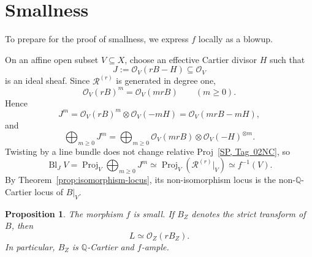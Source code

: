 \documentclass[11pt,a4paper]{article}
\newtheorem{proposition}[lemma]{Proposition}
\theoremstyle{definition}
\theoremstyle{definition}
\DeclareMathOperator{\Proj}{Proj}
\newcommand{\OO}{\mathcal O}
\newcommand{\RR}{\mathcal R}
\begin{document}
\section{Smallness}

To prepare for the proof of smallness, we express $f$ locally as a blowup.

On an affine open subset $V\subseteq X$, choose an effective Cartier divisor $H$ such that
\[
 J:=\OO_V(rB-H)\subseteq\OO_V
\]
is an ideal sheaf. Since $\RR^{(r)}$ is generated in degree one,
\[
 \OO_V(rB)^m=\OO_V(mrB)\qquad(m\ge0).
\]
Hence
\[
 J^m=\OO_V(rB)^m\otimes\OO_V(-mH)
     =\OO_V(mrB-mH),
\]
and
\[
 \bigoplus_{m\ge0}J^m
 =\bigoplus_{m\ge0}\OO_V(mrB)\otimes\OO_V(-H)^{\otimes m}.
\]
Twisting by a line bundle does not change relative Proj~\href{https://stacks.math.columbia.edu/tag/02NC}{[SP, Tag~02NC]}, so
\begin{equation}\label{eq:blowup-presentation}
 \operatorname{Bl}_J V
 =\Proj_V\bigoplus_{m\ge0}J^m
 \simeq\Proj_V(\RR^{(r)}|_V)
 \simeq f^{-1}(V).
\end{equation}
By Theorem~\ref{prop:isomorphism-locus}, its non-isomorphism locus is the non-$\mathbb Q$-Cartier locus of $B|_V$.

\begin{proposition}\label{prop:smallness}
The morphism $f$ is small. If $B_Z$ denotes the strict transform of $B$, then
\[
 L\simeq\OO_Z(rB_Z).
\]
In particular, $B_Z$ is $\mathbb Q$-Cartier and $f$-ample.
\end{proposition}
\end{document}
